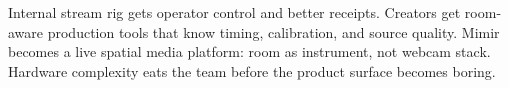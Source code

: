 \ProjectionBand
{Internal stream rig gets operator control and better receipts.}
{Creators get room-aware production tools that know timing, calibration, and source quality.}
{Mimir becomes a live spatial media platform: room as instrument, not webcam stack.}
{Hardware complexity eats the team before the product surface becomes boring.}

